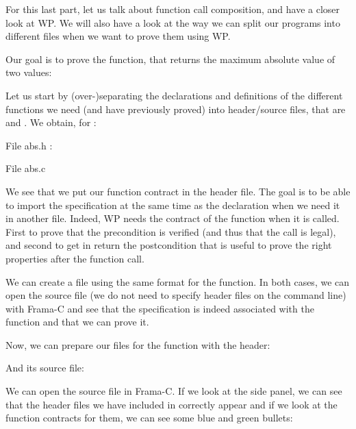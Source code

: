 For this last part, let us talk about function call composition,
and have a closer look at WP. We will also have a look at the way we can split
our programs into different files when we want to prove them using WP.

Our goal is to prove the  function, that returns
the maximum absolute value of two values:






Let us start by (over-)separating the declarations and definitions of the
different functions we need (and have previously proved) into header/source
files, that are  and . We obtain, for
:



File abs.h :




File abs.c




We see that we put our function contract in the header file.
The goal is to be able to import the specification at the same time as
the declaration when we need it in another file. Indeed, WP needs the
contract of the function when it is called. First to prove that the
precondition is verified (and thus that the call is legal), and second
to get in return the postcondition that is useful to prove the right
properties after the function call.

We can create a file using the same format for the 
function. In both cases, we can open the source file (we do not need to
specify header files on the command line) with Frama-C and see that
the specification is indeed associated with the function and that we can prove
it.


Now, we can prepare our files for the  function with
the header:






And its source file:






We can open the source file in Frama-C. If we look at the side panel, we
can see that the header files we have included in 
correctly appear and if we look at the function contracts for them, we
can see some blue and green bullets:



